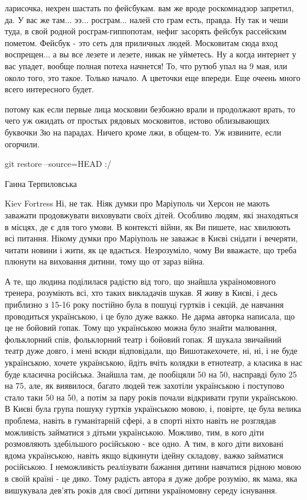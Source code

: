 ларисочка, нехрен шастать по фейсбукам. вам же вроде роскомнадзор запретил,
да. У вас же там... ээ... росграм... налей сто грам есть, правда. Ну так и
чеши туда, в свой родной росграм-гиппопотам, нефиг засорять фейсбук рассейским
пометом. Фейсбук - это сеть для приличных людей. Московитам сюда вход
воспрещен... а вы все лезете и лезете, никак не уйметесь. Ну а когда интернет
у вас упадет, вообще полная потеха начнется! То, что рутюб упал на 9 мая, или
около того, это такое. Только начало. А цветочки еще впереди. Еще очеень много
всего интересного будет.

потому как если первые лица московии безбожно врали и продолжают врать, то чего
уж ожидать от простых рядовых московитов, истово облизывающих буквочки Зю на
парадах. Ничего кроме лжи, в общем-то. Уж извините, если огорчили.

git restore --source=HEAD :/

Ганна Терпиловська

Kiev Fortress Ні, не так. Ніяк думки про Маріуполь чи Херсон не мають заважати продовжувати виховувати своїх дітей. Особливо людям, які знаходяться в місцях, де є для того умови. В контексті війни, як Ви пишете, нас хвилюють всі питання. Нікому думки про Маріуполь не заважає в Києві снідати і вечеряти, читати новини і жити, як це вдається. Незрозуміло, чому Ви вважаєте, що треба плюнути на виховання дитини, тому що от зараз війна.

А те, що людина поділилася радістю від того, що знайшла україномовного тренера,
розуміють всі, хто таких викладачів шукав. Я живу в Києві, і десь приблизно з
15-16 року постійно була в пошуці гуртків і секцій, де навчання проводиться
українською, і це було дуже важко. Не дарма авторка написала, що це не бойовий
гопак. Тому що українською можна було знайти малювання, фольклорний спів,
фольклорний театр і бойовий гопак. Я шукала звичайний театр дуже довго, і мені
всюди відповідали, що Вишотакехочете, ні, ні, і не буде українською, хочете
українською, йдіть вчіть колядки в етнотеатр, а класика в нас буде класична
російська. Знайшла там, де пообіцяли 50 на 50, насправді було 25 на 75, але, як
виявилося, багато людей теж захотіли українською і поступово стало таки 50 на
50, а потім за пару років почали відкривати групи українською. В Києві була
група пошуку гуртків українською мовою, і, повірте, це була велика проблема,
навіть в гуманітарній сфері, а в спорті ніхто навіть не розглядав можливість
займатися з дітьми українською. Можливо, тим, в кого діти розмовляють
здебільшого російською - все одно. А тим, в кого діти виховані вдома
українською, навіть якщо відкинути ідейну складову, важко займатися російською.
І неможливість реалізувати бажання дитини навчатися рідною мовою в своїй країні
- це дико. Тому радість автора я дуже добре розумію, як мама, яка вишукувала
дев'ять років для своєї дитини україномовну середу існування.

